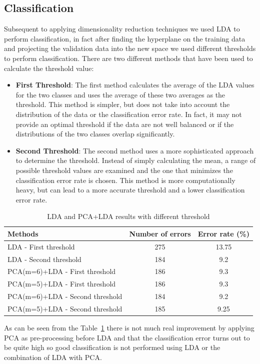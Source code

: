 \documentclass{article}
\begin{document}
\subsection{Classification}
Subsequent to applying dimensionality reduction techniques we used LDA to perform classification, in fact after finding the hyperplane on the training data and projecting the validation data into the new space we used different thresholds to perform classification.
There are two different methods that have been used to calculate the threshold value:
\begin{itemize}

\item \textbf{First Threshold}: The first method calculates the average of the LDA values for the two classes and uses the average of these two averages as the threshold. This method is simpler, but does not take into account the distribution of the data or the classification error rate. In fact, it may not provide an optimal threshold if the data are not well balanced or if the distributions of the two classes overlap significantly.
\item \textbf{Second Threshold}: The second method uses a more sophisticated approach to determine the threshold. Instead of simply calculating the mean, a range of possible threshold values are examined and the one that minimizes the classification error rate is chosen. This method is more computationally heavy, but can lead to a more accurate threshold and a lower classification error rate.  
\end{itemize}
\begin{table}[H]
    \centering
    \begin{tabular}{lcc}
    \hline
    \textbf{Methods} & \textbf{Number of errors} & \textbf{Error rate (\%)} \\
    \hline
    LDA - First threshold & 275 & 13.75 \\
    LDA - Second threshold & 184 & 9.2 \\
    \hline
    PCA(m=6)+LDA - First threshold & 186 & 9.3 \\
    PCA(m=5)+LDA - First threshold & 186 & 9.3 \\
    PCA(m=6)+LDA - Second threshold & 184 & 9.2 \\
    PCA(m=5)+LDA - Second threshold & 185 & 9.25 \\
    \hline
    \end{tabular}
    \caption{LDA and PCA+LDA results with different threshold}
    \label{tab:resultsPCALDA}
\end{table}
As can be seen from the Table~\ref{tab:resultsPCALDA} there is not much real improvement by applying PCA as pre-processing before LDA and that the classification error turns out to be quite high so good classification is not performed using LDA or the combination of LDA with PCA.
\end{document}

